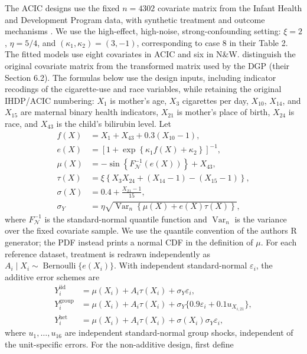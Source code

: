 The ACIC designs use the fixed \(n=4302\) covariate matrix from the Infant Health and Development Program data, with synthetic treatment and outcome mechanisms \cite{hahnAtlanticCausalInference2019}. We use the high-effect, high-noise, strong-confounding setting: \(\xi=2\), \(\eta=5/4\), and \((\kappa_1,\kappa_2)=(3,-1)\), corresponding to case 8 in their Table 2. The fitted models use eight covariates in ACIC and six in N\&W.  distinguish the original covariate matrix from the transformed matrix used by the DGP (their Section 6.2). The formulas below use the design inputs, including indicator recodings of the cigarette-use and race variables, while retaining the original IHDP/ACIC numbering: \(X_1\) is mother's age, \(X_3\) cigarettes per day, \(X_{10}\), \(X_{14}\), and \(X_{15}\) are maternal binary health indicators, \(X_{21}\) is mother's place of birth, \(X_{24}\) is race, and \(X_{43}\) is the child's bilirubin level. Let
\[
\begin{aligned}
f(X)&=X_1+X_{43}+0.3(X_{10}-1),\\
e(X)&=\left[1+\exp\!\left\{\kappa_1f(X)+\kappa_2\right\}\right]^{-1},\\
\mu(X)&=-\sin\!\left\{F_{\!\mathcal N}^{-1}(e(X))\right\}+X_{43},\\
\tau(X)&=\xi\left\{X_3X_{24}+(X_{14}-1)-(X_{15}-1)\right\},\\
\sigma(X)&=0.4+\frac{X_{21}-1}{15},\\
\sigma_Y&=\eta\sqrt{\operatorname{Var}_n\!\left\{\mu(X)+e(X)\tau(X)\right\}},
\end{aligned}
\]
where \(F_{\!\mathcal N}^{-1}\) is the standard-normal quantile function and \(\operatorname{Var}_n\) is the variance over the fixed covariate sample. We use the quantile convention of the authors\textquotesingle{} R generator; the PDF instead prints a normal CDF in the definition of \(\mu\). For each reference dataset, treatment is redrawn independently as \(A_i\mid X_i\sim\operatorname{Bernoulli}\{e(X_i)\}\). With independent standard-normal \(\varepsilon_i\), the additive error schemes are
\[
\begin{aligned}
Y_i^{\mathrm{iid}}&=\mu(X_i)+A_i\tau(X_i)+\sigma_Y\varepsilon_i,\\
Y_i^{\mathrm{group}}&=\mu(X_i)+A_i\tau(X_i)+\sigma_Y\{0.9\varepsilon_i+0.1u_{X_{i,21}}\},\\
Y_i^{\mathrm{het}}&=\mu(X_i)+A_i\tau(X_i)+\sigma(X_i)\sigma_Y\varepsilon_i,
\end{aligned}
\]
where \(u_1,\ldots,u_{16}\) are independent standard-normal group shocks, independent of the unit-specific errors. For the non-additive design, first define
